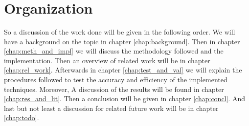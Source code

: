 	\section{Organization}
	
	\paragraph{}
	So a discussion of the work done will be given in the following order. We will have a background on the topic in chapter \ref{chap:background}. Then in chapter \ref{chap:meth_and_impl} we will discuss the methodology followed and the implementation. Then an overview of related work will be in chapter \ref{chap:rel_work}. Afterwards in chapter \ref{chap:test_and_val} we will explain the procedures followed to test the accuracy and efficiency of the implemented techniques. Moreover, A discussion of the results will be found in chapter \ref{chap:res_and_lit}. Then a conclusion will be given in chapter \ref{chap:concl}. And last but not least a discussion for related future work will be in chapter \ref{chap:todo}. 

